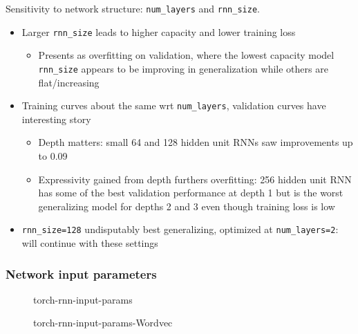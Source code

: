 Sensitivity to network structure: \texttt{num\_layers} and \texttt{rnn\_size}.
\begin{itemize}
    \item Larger \texttt{rnn\_size} leads to higher capacity and lower training loss
        \begin{itemize}
            \item Presents as overfitting on validation, where the lowest capacity
                model \texttt{rnn\_size} appears to be improving in generalization while
                others are flat/increasing
        \end{itemize}
    \item Training curves about the same wrt \texttt{num\_layers}, validation curves have interesting story
        \begin{itemize}
            \item Depth matters: small 64 and 128 hidden unit RNNs saw improvements up to 0.09
            \item Expressivity gained from depth furthers overfitting: 256
                hidden unit RNN has some of the best validation performance at
                depth 1 but is the worst generalizing model for depths 2
                and 3 even though training loss is low
        \end{itemize}
    \item \texttt{rnn\_size=128} undisputably best generalizing, optimized at
        \texttt{num\_layers=2}: will continue with these settings
\end{itemize}

\subsubsection{Network input parameters}


\begin{figure}[tb]
    \centering
    
    \caption{torch-rnn-input-params}
    \label{fig:torch-rnn-input-params}
\end{figure}

\begin{figure}[tb]
  \centering
    
  \caption{torch-rnn-input-params-Wordvec}
  \label{fig:torch-rnn-input-params-wordvec}
\end{figure}

